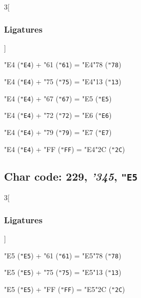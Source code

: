 \documentclass{article}
\newlength{\maxcharwidth}
\begin{document}
\begin{multicols}{3}[\subsubsection{Ligatures}]

{\testfont\char"E4\noboundary} ({\tt"E4}) + {\testfont\char"61\noboundary} ({\tt"61}) = {\testfont\char"E4\noboundary}{\testfont\char"78\noboundary} ({\tt"78}) 

{\testfont\char"E4\noboundary} ({\tt"E4}) + {\testfont\char"75\noboundary} ({\tt"75}) = {\testfont\char"E4\noboundary}{\testfont\char"13\noboundary} ({\tt"13}) 

{\testfont\char"E4\noboundary} ({\tt"E4}) + {\testfont\char"67\noboundary} ({\tt"67}) = {\testfont\char"E5\noboundary} ({\tt"E5}) 

{\testfont\char"E4\noboundary} ({\tt"E4}) + {\testfont\char"72\noboundary} ({\tt"72}) = {\testfont\char"E6\noboundary} ({\tt"E6}) 

{\testfont\char"E4\noboundary} ({\tt"E4}) + {\testfont\char"79\noboundary} ({\tt"79}) = {\testfont\char"E7\noboundary} ({\tt"E7}) 

{\testfont\char"E4\noboundary} ({\tt"E4}) + {\testfont\char"FF\noboundary} ({\tt"FF}) = {\testfont\char"E4\noboundary}{\testfont\char"2C\noboundary} ({\tt"2C}) 

\end{multicols}

\subsection{Char code: 229, {\it'345}, {\tt"E5}}
\label{char_229}


\begin{multicols}{3}[\subsubsection{Ligatures}]

{\testfont\char"E5\noboundary} ({\tt"E5}) + {\testfont\char"61\noboundary} ({\tt"61}) = {\testfont\char"E5\noboundary}{\testfont\char"78\noboundary} ({\tt"78}) 

{\testfont\char"E5\noboundary} ({\tt"E5}) + {\testfont\char"75\noboundary} ({\tt"75}) = {\testfont\char"E5\noboundary}{\testfont\char"13\noboundary} ({\tt"13}) 

{\testfont\char"E5\noboundary} ({\tt"E5}) + {\testfont\char"FF\noboundary} ({\tt"FF}) = {\testfont\char"E5\noboundary}{\testfont\char"2C\noboundary} ({\tt"2C}) 

\end{multicols}
\end{document}
